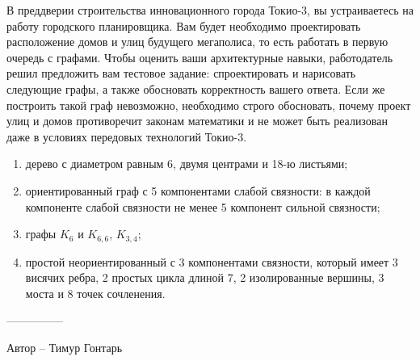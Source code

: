 \question
В преддверии строительства инновационного города Токио-3, вы устраиваетесь на работу городского планировщика. Вам будет необходимо проектировать расположение домов и улиц будущего мегаполиса, то есть работать в первую очередь с графами. Чтобы оценить ваши архитектурные навыки, работодатель решил предложить вам тестовое задание: спроектировать и нарисовать следующие графы, а также обосновать корректность вашего ответа. Если же построить такой граф невозможно, необходимо строго обосновать, почему проект улиц и домов противоречит законам математики и не может быть реализован даже в условиях передовых технологий Токио-3.

\begin{enumerate}
\item  дерево с диаметром равным 6, двумя центрами  и  18-ю листьями;
\item  ориентированный граф с 5 компонентами слабой связности: в  каждой компоненте слабой связности не менее 5 компонент сильной связности;
\item  графы $K_6$ и $K_{6,6}$, $K_{3,4}$;
\item  простой неориентированный с 3 компонентами связности, который имеет 3 висячих ребра, 2 простых цикла длиной 7, 2 изолированные вершины, 3 моста и 8 точек сочленения.
\end{enumerate}

---------------

Автор -- Тимур Гонтарь
